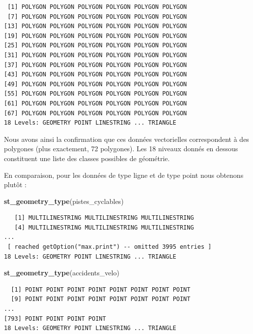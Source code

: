 \documentclass[
  12pt,
]{krantz}
\newenvironment{Shaded}{\begin{snugshade}}{\end{snugshade}}
\newcommand{\KeywordTok}[1]{\textcolor[rgb]{0.13,0.29,0.53}{\textbf{#1}}}
\newcommand{\NormalTok}[1]{#1}
\begin{document}
\begin{verbatim}
 [1] POLYGON POLYGON POLYGON POLYGON POLYGON POLYGON
 [7] POLYGON POLYGON POLYGON POLYGON POLYGON POLYGON
[13] POLYGON POLYGON POLYGON POLYGON POLYGON POLYGON
[19] POLYGON POLYGON POLYGON POLYGON POLYGON POLYGON
[25] POLYGON POLYGON POLYGON POLYGON POLYGON POLYGON
[31] POLYGON POLYGON POLYGON POLYGON POLYGON POLYGON
[37] POLYGON POLYGON POLYGON POLYGON POLYGON POLYGON
[43] POLYGON POLYGON POLYGON POLYGON POLYGON POLYGON
[49] POLYGON POLYGON POLYGON POLYGON POLYGON POLYGON
[55] POLYGON POLYGON POLYGON POLYGON POLYGON POLYGON
[61] POLYGON POLYGON POLYGON POLYGON POLYGON POLYGON
[67] POLYGON POLYGON POLYGON POLYGON POLYGON POLYGON
18 Levels: GEOMETRY POINT LINESTRING ... TRIANGLE
\end{verbatim}

Nous avons ainsi la confirmation que ces données vectorielles correspondent à des polygones (plus exactement, 72 polygones). Les 18 niveaux donnés en dessous constituent une liste des classes possibles de géométrie.

En comparaison, pour les données de type ligne et de type point nous obtenons plutôt :

\begin{Shaded}
\begin{Highlighting}[]
\KeywordTok{st_geometry_type}\NormalTok{(pistes_cyclables)}
\end{Highlighting}
\end{Shaded}

\begin{verbatim}
   [1] MULTILINESTRING MULTILINESTRING MULTILINESTRING
   [4] MULTILINESTRING MULTILINESTRING MULTILINESTRING
...
 [ reached getOption("max.print") -- omitted 3995 entries ]
18 Levels: GEOMETRY POINT LINESTRING ... TRIANGLE
\end{verbatim}

\begin{Shaded}
\begin{Highlighting}[]
\KeywordTok{st_geometry_type}\NormalTok{(accidents_velo)}
\end{Highlighting}
\end{Shaded}

\begin{verbatim}
  [1] POINT POINT POINT POINT POINT POINT POINT POINT
  [9] POINT POINT POINT POINT POINT POINT POINT POINT
...
[793] POINT POINT POINT POINT
18 Levels: GEOMETRY POINT LINESTRING ... TRIANGLE
\end{verbatim}
\end{document}
